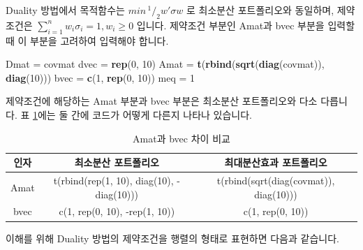 \documentclass[12pt,]{book}
\newenvironment{Shaded}{\begin{snugshade}}{\end{snugshade}}
\newcommand{\DecValTok}[1]{\textcolor[rgb]{0.00,0.00,0.81}{#1}}
\newcommand{\KeywordTok}[1]{\textcolor[rgb]{0.13,0.29,0.53}{\textbf{#1}}}
\newcommand{\NormalTok}[1]{#1}
\newcommand{\StringTok}[1]{\textcolor[rgb]{0.31,0.60,0.02}{#1}}
\begin{document}
Duality 방법에서 목적함수는 \(min\,^1/_2w'\sigma w\) 로 최소분산 포트폴리오와 동일하며, 제약조건은 \(\sum_{i=1}^n w_i \sigma_i = 1, w_i \ge 0\) 입니다. 제약조건 부분인 Amat과 bvec 부분을 입력할 때 이 부분을 고려하여 입력해야 합니다.

\begin{Shaded}
\begin{Highlighting}[]
\NormalTok{Dmat =}\StringTok{ }\NormalTok{covmat}
\NormalTok{dvec =}\StringTok{ }\KeywordTok{rep}\NormalTok{(}\DecValTok{0}\NormalTok{, }\DecValTok{10}\NormalTok{)}
\NormalTok{Amat =}\StringTok{ }\KeywordTok{t}\NormalTok{(}\KeywordTok{rbind}\NormalTok{(}\KeywordTok{sqrt}\NormalTok{(}\KeywordTok{diag}\NormalTok{(covmat)), }\KeywordTok{diag}\NormalTok{(}\DecValTok{10}\NormalTok{)))}
\NormalTok{bvec =}\StringTok{ }\KeywordTok{c}\NormalTok{(}\DecValTok{1}\NormalTok{, }\KeywordTok{rep}\NormalTok{(}\DecValTok{0}\NormalTok{, }\DecValTok{10}\NormalTok{))}
\NormalTok{meq =}\StringTok{ }\DecValTok{1}
\end{Highlighting}
\end{Shaded}

제약조건에 해당하는 Amat 부분과 bvec 부분은 최소분산 포트폴리오와 다소 다릅니다. 표 \ref{tab:mvmdp}에는 둘 간에 코드가 어떻게 다른지 나타나 있습니다.

\begin{table}[!h]

\caption{\label{tab:mvmdp}Amat과 bvec 차이 비교}
\centering
\fontsize{8}{10}\selectfont
\begin{tabular}{ccc}
\toprule
인자 & 최소분산 포트폴리오 & 최대분산효과 포트폴리오\\
\midrule
\rowcolor{gray!6}  Amat & t(rbind(rep(1, 10), diag(10), -diag(10))) & t(rbind(sqrt(diag(covmat)), diag(10)))\\
bvec & c(1, rep(0, 10), -rep(1, 10)) & c(1, rep(0, 10))\\
\bottomrule
\end{tabular}
\end{table}

이해를 위해 Duality 방법의 제약조건을 행렬의 형태로 표현하면 다음과 같습니다.
\end{document}

